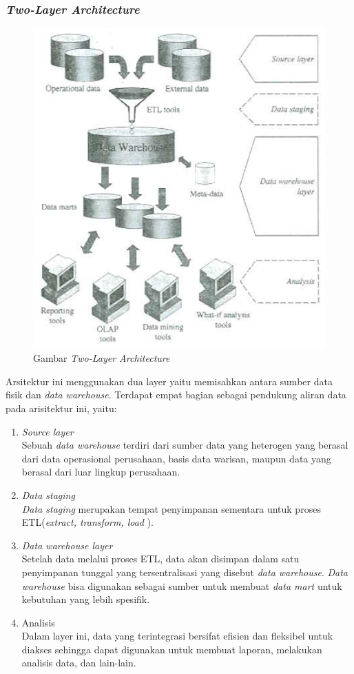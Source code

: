 \subsubsection{\textit{Two-Layer Architecture}}
\begin{figure}[h]
	\centering
	\includegraphics[scale=0.85]{Gambar/two-layer}
	\caption{Gambar \textit{Two-Layer Architecture}\cite{Matteo:2009}}
	\end{figure}
Arsitektur ini menggunakan dua layer yaitu memisahkan antara sumber data fisik dan \textit{data warehouse}. Terdapat empat bagian sebagai pendukung aliran data pada arisitektur ini, yaitu: 
\begin{enumerate}
	\item \textit{Source layer}\\
	Sebuah \textit{data warehouse} terdiri dari sumber data yang heterogen yang berasal dari data operasional perusahaan, basis data warisan, maupun data yang berasal dari luar lingkup perusahaan.
	\item \textit{Data staging}\\
	\textit{Data staging} merupakan tempat penyimpanan sementara untuk proses ETL(\textit{extract, transform, load }).
	\item \textit{Data warehouse layer}\\
	Setelah data melalui proses ETL, data akan disimpan dalam satu penyimpanan tunggal yang tersentralisasi yang disebut \textit{data warehouse}. \textit{Data warehouse} bisa digunakan sebagai sumber untuk membuat \textit{data mart} untuk kebutuhan yang lebih spesifik.
	\item Analisis\\
	Dalam layer ini, data yang terintegrasi bersifat efisien dan fleksibel untuk diakses sehingga dapat digunakan untuk membuat laporan, melakukan analisis data, dan lain-lain.
\end{enumerate}

